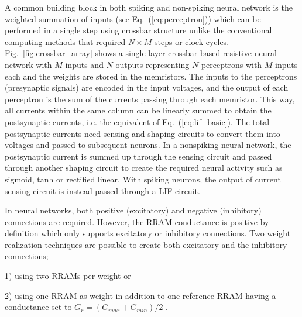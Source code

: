 \documentclass[english]{article}
\renewcommand{\refeq}[1]{{Eq.~(\ref{#1})}}
\newcommand{\reffig}[1]{{Fig.~\ref{#1}}}
\renewcommand{\cite}{\citep}
\begin{document}
A common building block in both spiking and non-spiking neural network is the weighted summation of inputs (see \refeq{eq:perceptron}) which can be performed in a single step using crossbar structure unlike the conventional computing methods that required $N\times M$ steps or clock cycles. 
\reffig{fig:crossbar_array} shows a single-layer crossbar based resistive neural network with $M$ inputs and $N$ outputs representing $N$ perceptrons with $M$ inputs each and the weights are stored in the memristors. 
The inputs to the perceptrons (presynaptic signals) are encoded in the input voltages, and the output of each perceptron is the sum of the currents passing through each memristor. 
This way, all currents within the same column can be linearly summed to obtain the postsynaptic currents, i.e. the equivalent of \refeq{eq:lif_basic}.
The total postsynaptic currents need sensing and shaping circuits to convert them into voltages and passed to subsequent neurons. In a nonspiking neural network, the postsynaptic current is summed up through the sensing circuit and passed through another shaping circuit to create the required neural activity such as sigmoid, tanh or rectified linear.  
With spiking neurons, the output of current sensing circuit is instead passed through a \ac{LIF} circuit.

In neural networks, both positive (excitatory) and negative (inhibitory) connections are required. 
However, the RRAM conductance is positive by definition which only supports excitatory or inhibitory connections. 
Two weight realization techniques are possible to create both excitatory and the inhibitory connections; 

1) using two RRAMs per weight \cite{prezioso2015training,li2018efficient} or

2) using one RRAM as weight in addition to one reference RRAM having a conductance set to $G_r=(G_{max}+G_{min})/2$ \cite{chang2017mitigating,fouda2018overcoming}. 
\end{document}
